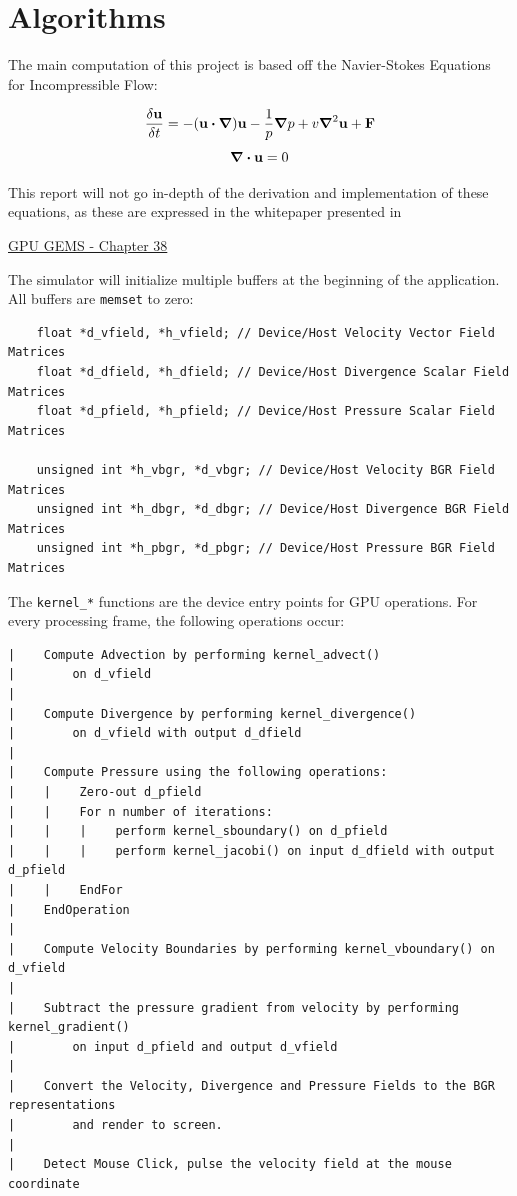 \documentclass[
10pt, %
letterpaper, %
oneside, %
headinclude,footinclude, %
BCOR5mm, %
]{scrartcl}
\begin{document}
\section{Algorithms} %
The main computation of this project is based off the Navier-Stokes Equations for Incompressible Flow:

\begin{equation}
    \frac{\delta \vb{u}}{\delta t} = - (\vb{u} \dotproduct \grad)\vb{u} - \frac{1}{p}\grad p + v \grad^2 \vb{u} + \vb{F}
\end{equation}
\begin{equation}
    \grad \dotproduct \vb{u} = 0
\end{equation}

This report will not go in-depth of the derivation and implementation of these equations, as these are expressed in the whitepaper presented in
\begin{center}
    \href{https://developer.nvidia.com/gpugems/gpugems/part-vi-beyond-triangles/chapter-38-fast-fluid-dynamics-simulation-gpu}{GPU GEMS - Chapter 38}
\end{center}

The simulator will initialize multiple buffers at the beginning of the application. All buffers are \verb|memset| to zero:
\begin{verbatim}
    float *d_vfield, *h_vfield; // Device/Host Velocity Vector Field Matrices
    float *d_dfield, *h_dfield; // Device/Host Divergence Scalar Field Matrices
    float *d_pfield, *h_pfield; // Device/Host Pressure Scalar Field Matrices
    
    unsigned int *h_vbgr, *d_vbgr; // Device/Host Velocity BGR Field Matrices
    unsigned int *h_dbgr, *d_dbgr; // Device/Host Divergence BGR Field Matrices
    unsigned int *h_pbgr, *d_pbgr; // Device/Host Pressure BGR Field Matrices
\end{verbatim}

The \verb|kernel_*| functions are the device entry points for GPU operations. For every processing frame, the following operations occur:

\begin{verbatim}
|    Compute Advection by performing kernel_advect()
|        on d_vfield
|
|    Compute Divergence by performing kernel_divergence()
|        on d_vfield with output d_dfield
|
|    Compute Pressure using the following operations:
|    |    Zero-out d_pfield
|    |    For n number of iterations:
|    |    |    perform kernel_sboundary() on d_pfield
|    |    |    perform kernel_jacobi() on input d_dfield with output d_pfield
|    |    EndFor
|    EndOperation
|
|    Compute Velocity Boundaries by performing kernel_vboundary() on d_vfield
|    
|    Subtract the pressure gradient from velocity by performing kernel_gradient()
|        on input d_pfield and output d_vfield
|
|    Convert the Velocity, Divergence and Pressure Fields to the BGR representations
|        and render to screen.
|
|    Detect Mouse Click, pulse the velocity field at the mouse coordinate
\end{verbatim}
\end{document}
